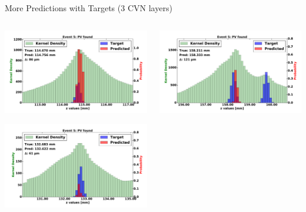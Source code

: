 \begin{frame}{More Predictions with Targets (3 CVN layers)}
  \begin{columns}[c]
        \begin{center}
            \includegraphics[width=1\textwidth,height=0.45\textwidth, trim=18 0 18 0]{images/120000_3layer_32.pdf}

            \includegraphics[width=1\textwidth, height=0.45\textwidth,trim=18 0 18 0]{images/120000_3layer_33.pdf}

        \end{center}
        \begin{center}
           \includegraphics[width=1\textwidth, height=0.45\textwidth, trim=18 0 18 0]{images/120000_3layer_34.pdf}


\end{center}
\end{columns}
\end{frame}
